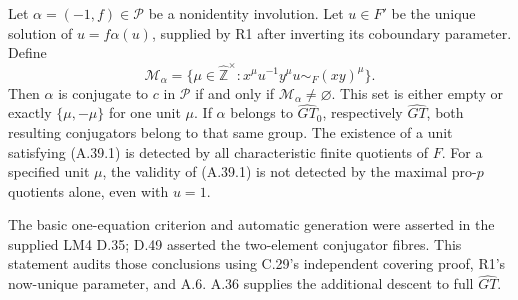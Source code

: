 Let \(\alpha=(-1,f)\in\mathcal P\) be a nonidentity
involution. Let \(u\in F'\) be the unique solution
of \(u=f\alpha(u)\), supplied by R1 after inverting
its coboundary parameter. Define
\[
 \mathcal M_\alpha=
 \{\mu\in\widehat{\mathbb Z}^{\times}:
       x^\mu u^{-1}y^\mu u\sim_F(xy)^\mu\}.
 \tag{A.39.1}
\]
Then \(\alpha\) is conjugate to \(c\) in
\(\mathcal P\) if and only if
\(\mathcal M_\alpha\ne\varnothing\).
This set is either empty or exactly
\(\{\mu,-\mu\}\) for one unit \(\mu\).
If \(\alpha\) belongs to \(\widehat{GT}_0\),
respectively \(\widehat{GT}\), both resulting
conjugators belong to that same group.
The existence of a unit satisfying (A.39.1) is
detected by all characteristic finite quotients of
\(F\). For a specified unit \(\mu\), the validity
of (A.39.1) is not detected by the maximal
pro-\(p\) quotients alone, even with \(u=1\).

The basic one-equation criterion and automatic
generation were asserted in the supplied LM4 D.35;
D.49 asserted the two-element conjugator fibres.
This statement audits those conclusions using
C.29's independent covering proof, R1's now-unique
parameter, and A.6. A.36 supplies the additional
descent to full \(\widehat{GT}\).

